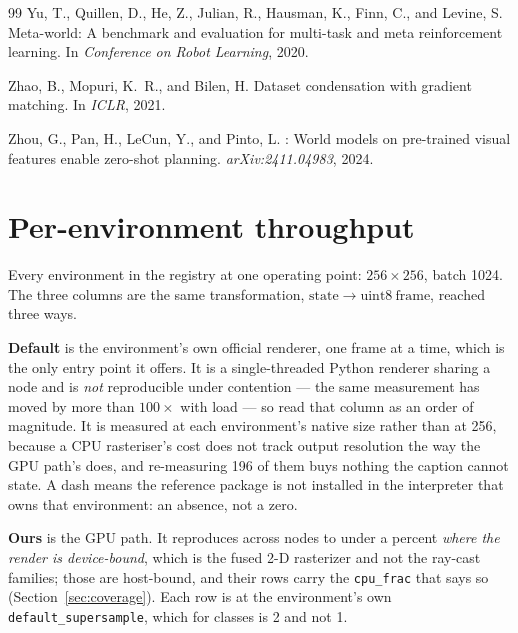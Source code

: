 \documentclass{article}
\begin{document}
\begin{thebibliography}{99}
Yu, T., Quillen, D., He, Z., Julian, R., Hausman, K., Finn, C., and Levine, S.
\newblock Meta-world: A benchmark and evaluation for multi-task and meta
  reinforcement learning.
\newblock In \emph{Conference on Robot Learning}, 2020.

Zhao, B., Mopuri, K.~R., and Bilen, H.
\newblock Dataset condensation with gradient matching.
\newblock In \emph{ICLR}, 2021.

Zhou, G., Pan, H., LeCun, Y., and Pinto, L.
: World models on pre-trained visual features enable
  zero-shot planning.
\newblock \emph{arXiv:2411.04983}, 2024.

\end{thebibliography}

\newpage
\appendix
\onecolumn

\section{Per-environment throughput}
\label{app:throughput}

Every environment in the registry at one operating point: $256\times256$, batch
1024. The three columns are the same transformation, $\mathrm{state}
\rightarrow \mathrm{uint8\ frame}$, reached three ways.

\textbf{Default} is the environment's own official renderer, one frame at a
time, which is the only entry point it offers. It is a single-threaded Python
renderer sharing a node and is \emph{not} reproducible under contention --- the
same measurement has moved by more than $100\times$ with load --- so read that
column as an order of magnitude. It is measured at each environment's native
size rather than at 256, because a CPU rasteriser's cost does not track output
resolution the way the GPU path's does, and re-measuring 196 of them buys
nothing the caption cannot state. A dash means the reference package is not
installed in the interpreter that owns that environment: an absence, not a zero.

\textbf{Ours} is the GPU path. It reproduces across nodes to under a percent
\emph{where the render is device-bound}, which is the fused 2-D rasterizer and
not the ray-cast families; those are host-bound, and their rows carry the
\texttt{cpu\_frac} that says so (Section~\ref{sec:coverage}). Each row is at the
environment's own \texttt{default\_supersample}, which for \seNssTwo{} classes
is 2 and not 1.
\end{document}
